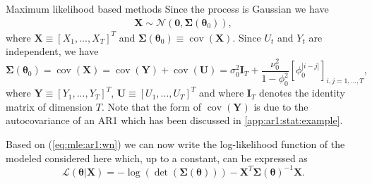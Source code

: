 \documentclass[envcountsect,usenames,dvipsnames]{beamer}
\DeclareMathOperator*{\cov}{cov}
\def\btheta{\bm \theta}
\theoremstyle{mystyle}
\begin{document}
\begin{frame}{Maximum likelihood based methods}
\small
    Since the process is Gaussian we have
    \begin{equation*}
       \begin{aligned}
            \mathbf{X} \sim \mathcal{N} \left(\mathbf{0}, \bm{\Sigma}(\btheta_0)\right),
       \end{aligned}
    \end{equation*}
    where $\mathbf{X} \equiv [X_1, ..., X_T]^T$ and $\bm{\Sigma}(\btheta_0) \equiv \cov(\mathbf{X})$. Since $U_t$ and $Y_t$ are independent, we have
    \begin{equation}
        \bm{\Sigma}(\btheta_0) = \cov(\mathbf{X}) = \cov(\mathbf{Y}) + \cov(\mathbf{U}) = \sigma^2_0 \mathbf{I}_T + \frac{\nu^2_0}{1 - \phi_0^2} \left[ \phi_0^{|i-j|}\right]_{i,j = 1, ..., T},\label{eq:mle:ar1:wn}
    \end{equation}
    where $\mathbf{Y} \equiv [Y_1, ..., Y_T]^T$, $\mathbf{U} \equiv [U_1, ..., U_T]^T$ and where $\mathbf{I}_T$ denotes the identity matrix of dimension $T$. Note that the form of $\cov(\mathbf{Y})$ is due to the autocovariance of an AR1 which has been discussed in \ref{app:ar1:stat:example}.
    
    \vspace{0.5cm}
    Based on (\ref{eq:mle:ar1:wn}) we can now write the log-likelihood function of the modeled considered here which, up to a constant, can be expressed as
    \begin{equation*}
        \mathcal{L}\left(\btheta | \mathbf{X} \right) = - \log \left( \det \left( \bm{\Sigma}(\btheta) \right)\right)  - \mathbf{X}^T \bm{\Sigma}(\btheta)^{-1} \mathbf{X}.
    \end{equation*}
\end{frame}
\end{document}
